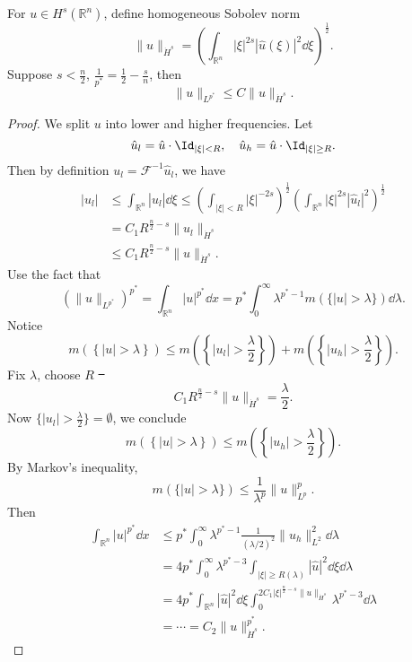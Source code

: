 \documentclass[UTF8,12pt]{article}
\numberwithin{theorem}{section}
\numberwithin{equation}{section}
\begin{document}
\begin{lemma}\hfill\par
    For \(u\in H^s(\mathbb{R}^n)\), define homogeneous Sobolev norm \[
        \|u\|_{\dot{H}^s}=\left(
        \int_{\mathbb{R}^n}|\xi|^{2s}|\hat{u}(\xi)|^2\dd{\xi}
        \right)^{\frac{1}{2}}
    .\] Suppose \(s<\frac{n}{2}\), \(\frac{1}{p^*}=\frac{1}{2}-\frac{s}{n}\),
    then \[
        \|u\|_{L^{p^*}}\le C\|u\|_{\dot{H}^s}
    .\] 
\end{lemma}
\begin{proof}
    We split \(u\) into lower and higher frequencies. Let \[
        \hat{u}_l=\hat{u}\cdot \Id_{|\xi|<R},
        \quad \hat{u}_h=\hat{u}\cdot \Id_{|\xi|\ge R}
    .\] Then by definition \(u_l=\mathcal{F}^{-1}\hat{u}_l\), we have
    \begin{align*}
        |u_l|
        &\le \int_{\mathbb{R}^n}|\hat{u}_l|\dd{\xi}
        \le \left(\int_{|\xi|<R}|\xi|^{-2s}\right)^{\frac{1}{2}}
        \left(\int_{\mathbb{R}^n}|\xi|^{2s}|\hat{u}_l|^2\right)^{\frac{1}{2}}\\ 
        &= C_1R^{\frac{n}{2}-s}\|u_l\|_{\dot{H}^s} \\
        &\le C_1R^{\frac{n}{2}-s}\|u\|_{\dot{H}^s}
    .\end{align*}
    Use the fact that \[
        (\|u\|_{L^{p^*}})^{p^*}=\int_{\mathbb{R}^n}|u|^{p^*}\dd{x}
        =p^*\int_{0}^{\infty}\lambda^{p^*-1}m(\{|u|>\lambda\})\dd{\lambda}
    .\] Notice \[
        m(\left\{|u|>\lambda\right\})\le m(\left\{|u_l|>\frac{\lambda}{2}\right\})
        +m(\left\{|u_h|>\frac{\lambda}{2}\right\})
    .\] Fix \(\lambda\), choose \(R\) \st\ \[
        C_1R^{\frac{n}{2}-s}\|u\|_{\dot{H}^s}=\frac{\lambda}{2}
    .\] Now \(\{|u_l|>\frac{\lambda}{2}\}=\emptyset\), we conclude \[
        m(\left\{|u|>\lambda\right\}) \le m(\left\{|u_h|>\frac{\lambda}{2}\right\})
    .\] By Markov's inequality, \[
        m(\{|u|>\lambda\})\le \frac{1}{\lambda^p}\|u\|_{L^p}^p
    .\] Then \begin{align*}
        \int_{\mathbb{R}^n}|u|^{p^*}\dd{x}
        &\le p^*\int_{0}^{\infty}\lambda^{p^*-1}\frac{1}{(\lambda/2)^2}
        \|u_h\|_{L^2}^2\dd{\lambda} \\
        &=4p^*\int_{0}^{\infty}\lambda^{p^*-3}\int_{|\xi|\ge R(\lambda)}
        |\hat{u}|^2\dd{\xi}\dd{\lambda} \\
        &=4p^*\int_{\mathbb{R}^n}|\hat{u}|^2\dd{\xi}\int_{0}^{2C_1|\xi|^{\frac{n}
        {2}-s}\|u\|_{\dot{H}^s}}\lambda^{p^*-3}\dd{\lambda} \\
        &=\cdots =C_2\|u\|_{\dot{H}^s}^{p^*}
    .\end{align*}
\end{proof}
\end{document}
